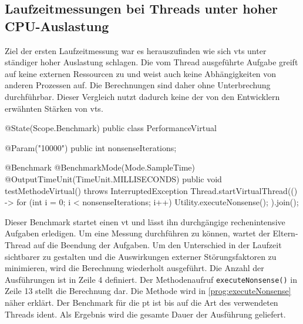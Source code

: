 \subsection{Laufzeitmessungen bei Threads unter hoher CPU-Auslastung}                                         
\label{subsec:LaufzeitmessungenbeiThreadsunterhoherAuslastung}

    Ziel der ersten Laufzeitmessung war es herauszufinden wie sich \Glspl{vt} unter ständiger hoher Auslastung schlagen. Die vom Thread ausgeführte Aufgabe greift auf keine 
    externen Ressourcen zu und weist auch keine Abhängigkeiten von anderen Prozessen auf. Die Berechnungen sind daher ohne Unterbrechung durchführbar.
    Dieser Vergleich nutzt dadurch keine der von den Entwicklern erwähnten  Stärken von \Glspl{vt}.
    \begin{program} [H]
        \caption{Benchmark eines \Glspl{vt} unter hoher Auslastung}
        \label{prog:BenchmarkEinesVTUnterHoherAuslastung}
    \begin{JavaCode}[language=Java, numbers=left]
@State(Scope.Benchmark)
public class PerformanceVirtual {

    @Param("10000")
    public int nonsenseIterations;

    @Benchmark
    @BenchmarkMode(Mode.SampleTime)
    @OutputTimeUnit(TimeUnit.MILLISECONDS)
    public void testMethodeVirtual() throws InterruptedException {
        Thread.startVirtualThread(() -> {
            for (int i = 0; i < nonsenseIterations; i++)
                Utility.executeNonsense();
        }).join();
    }
}\end{JavaCode}
    \end{program}
    Dieser Benchmark startet einen \gls{vt} und lässt ihn durchgängige rechenintensive Aufgaben erledigen. Um eine Messung durchführen zu können, wartet der Eltern-Thread auf
    die Beendung der Aufgaben. Um den Unterschied in der Laufzeit sichtbarer zu gestalten und die Auswirkungen externer Störungsfaktoren zu minimieren,
    wird die Berechnung wiederholt ausgeführt. Die Anzahl der Ausführungen ist in Zeile 4 definiert. Der Methodenaufruf \texttt{executeNonsense()} in Zeile 13 stellt die Berechnung dar.
    Die Methode wird in \ref{prog:executeNonsense} näher erklärt. Der Benchmark für die \gls{pt} ist bis auf die Art des verwendeten Threads ident.
    Als Ergebnis wird die gesamte Dauer der Ausführung geliefert. 

